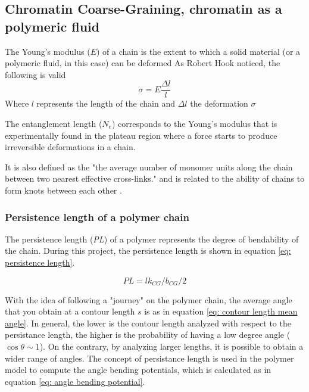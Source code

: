 
\subsection{Chromatin Coarse-Graining, chromatin as a polymeric fluid}

The Young's modulus ($E$) of a chain is the extent to which a solid material (or a polymeric fluid, in this case) can be deformed
As Robert Hook noticed, the following is valid 
\begin{equation}
    \sigma = E \frac{\Delta l}{l}
\end{equation}
Where $l$ represents the length of the chain and $\Delta l$ the deformation $\sigma$
\cite{grosbergGiantMoleculesHere2011}

The entanglement length ($N_e$) corresponds to the Young's modulus that is experimentally found in the plateau region where a force starts to produce irreversible deformations in a chain.



It is also defined as the "the average number of monomer units along the chain between two nearest effective cross-links."
and is related to the ability of chains to form knots between each other
\cite{grosbergGiantMoleculesHere2011}
.



\subsubsection{Persistence length of a polymer chain}

The persistence length (\textit{PL}) of a polymer represents the degree of bendability of the chain. During this project, the persistence length is shown in equation \ref{eq: persistence length}.


\begin{equation}
    PL = lk_{CG} / b_{CG} / 2
\end{equation}

With the idea of following a "journey" on the polymer chain, the average angle that you obtain at a contour length $s$ is as in equation \ref{eq: contour length mean angle}. In general, the lower is the contour length analyzed with respect to the persistance length, the higher is the probability of having a low degree angle ($\cos{\theta} \sim 1$). On the contrary, by analyzing larger lengths, it is possible to obtain a wider range of angles.
The concept of persistance length is used in the polymer model to compute the angle bending potentials, which is calculated as in equation \ref{eq: angle bending potential}.


